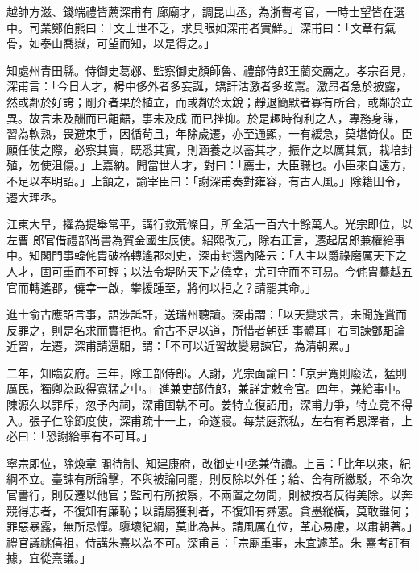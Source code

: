 \begin{pinyinscope}
 越帥方滋、錢端禮皆薦深甫有
 廊廟才，調昆山丞，為浙曹考官，一時士望皆在選中。司業鄭伯熊曰：「文士世不乏，求具眼如深甫者實鮮。」深甫曰：「文章有氣骨，如泰山喬嶽，可望而知，以是得之。」



 知處州青田縣。侍御史葛邲、監察御史顏師魯、禮部侍郎王藺交薦之。孝宗召見，深甫言：「今日人才，枵中侈外者多妄誕，矯訐沽激者多眩鬻。激昂者急於披露，然或鄰於好誇；剛介者果於植立，而或鄰於太銳；靜退簡默者寡有所合，或鄰於立異。故言未及酬而已齟齬，事未及成
 而已挫抑。於是趣時徇利之人，專務身謀，習為軟熟，畏避束手，因循茍且，年除歲遷，亦至通顯，一有緩急，莫堪倚仗。臣願任使之際，必察其實，既悉其實，則涵養之以蓄其才，振作之以厲其氣，栽培封殖，勿使沮傷。」上嘉納。問當世人才，對曰：「薦士，大臣職也。小臣來自遠方，不足以奉明詔。」上頷之，諭宰臣曰：「謝深甫奏對雍容，有古人風。」除籍田令，遷大理丞。



 江東大旱，擢為提舉常平，講行救荒條目，所全活一百六十餘萬人。光宗即位，以左曹
 郎官借禮部尚書為賀金國生辰使。紹熙改元，除右正言，遷起居郎兼權給事中。知閣門事韓侂胄破格轉遙郡刺史，深甫封還內降云：「人主以爵祿磨厲天下之人才，固可重而不可輕；以法令堤防天下之僥幸，尤可守而不可易。今侂胄驀越五官而轉遙郡，僥幸一啟，攀援踵至，將何以拒之？請罷其命。」



 進士俞古應詔言事，語涉詆訐，送瑞州聽讀。深甫謂：「以天變求言，未聞旌賞而反罪之，則是名求而實拒也。俞古不足以道，所惜者朝廷
 事體耳」右司諫鄧馹論近習，左遷，深甫請還馹，謂：「不可以近習故變易諫官，為清朝累。」



 二年，知臨安府。三年，除工部侍郎。入謝，光宗面諭曰：「京尹寬則廢法，猛則厲民，獨卿為政得寬猛之中。」進兼吏部侍郎，兼詳定敕令官。四年，兼給事中。陳源久以罪斥，忽予內祠，深甫固執不可。姜特立復詔用，深甫力爭，特立竟不得入。張子仁除節度使，深甫疏十一上，命遂寢。每禁庭燕私，左右有希恩澤者，上必曰：「恐謝給事有不可耳。」



 寧宗即位，除煥章
 閣待制、知建康府，改御史中丞兼侍讀。上言：「比年以來，紀綱不立。臺諫有所論擊，不與被論同罷，則反除以外任；給、舍有所繳駁，不命次官書行，則反遷以他官；監司有所按察，不兩置之勿問，則被按者反得美除。以奔競得志者，不復知有廉恥；以請屬獲利者，不復知有彞憲。貪墨縱橫，莫敢誰何；罪惡暴露，無所忌憚。隳壞紀綱，莫此為甚。請風厲在位，革心易慮，以肅朝著。」禮官議祧僖祖，侍講朱熹以為不可。深甫言：「宗廟重事，未宜遽革。朱
 熹考訂有據，宜從熹議。」




\end{pinyinscope}
